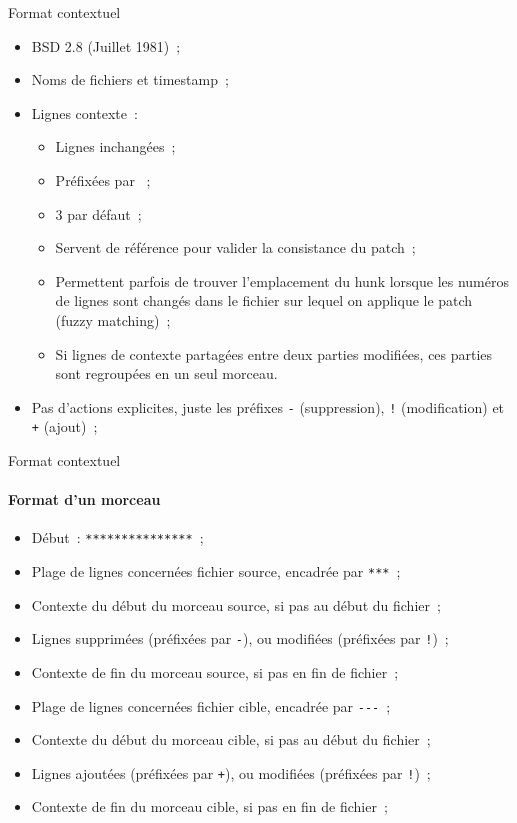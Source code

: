 \begin{frame}[fragile]{Format contextuel}
\begin{itemize}[<+->]
 \item BSD 2.8 (Juillet 1981)~;
 \item Noms de fichiers et timestamp~;
 \item Lignes contexte~:
 \begin{itemize}[<+->]
  \item Lignes inchangées~;
  \item Préfixées par \textvisiblespace~;
  \item 3 par défaut~;
  \item Servent de référence pour valider la consistance du patch~;
  \item Permettent parfois de trouver l'emplacement du hunk lorsque les numéros de lignes sont changés dans le fichier sur lequel on applique le patch (fuzzy matching)~;
  \item Si lignes de contexte partagées entre deux parties modifiées, ces parties sont regroupées en un seul morceau.
 \end{itemize}
 \item Pas d'actions explicites, juste les préfixes \verb|-| (suppression), \verb|!| (modification) et \verb|+| (ajout)~;
 \end{itemize}
\end{frame}
 
\begin{frame}[fragile]{Format contextuel}
 \framesubtitle{Format d'un morceau}
 \begin{itemize}[<+->]
  \item Début~: \verb|***************|~;
  \item Plage de lignes concernées fichier source, encadrée par \verb|***|~;
  \item Contexte du début du morceau source, si pas au début du fichier~;
  \item Lignes supprimées (préfixées par \verb|-|), ou modifiées (préfixées par \verb|!|)~;
  \item Contexte de fin du morceau source, si pas en fin de fichier~;
  \item Plage de lignes concernées fichier cible, encadrée par \verb|---|~;
  \item Contexte du début du morceau cible, si pas au début du fichier~;
  \item Lignes ajoutées (préfixées par \verb|+|), ou modifiées (préfixées par \verb|!|)~;
  \item Contexte de fin du morceau cible, si pas en fin de fichier~;
 \end{itemize}
\end{frame}

